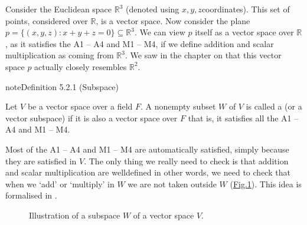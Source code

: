 \documentclass[letterpaper,10pt,english]{jupyterBook}
\let\sphinxpxdimen\pdfpxdimen\else\newdimen\sphinxpxdimen
\begin{document}
\sphinxAtStartPar
Consider the Euclidean space \(\mathbb{R}^3\) (denoted using \(x,y,z\)\sphinxhyphen{}coordinates). This set of points, considered over \(\mathbb{R}\), is a vector space. Now consider the plane \(p = \{(x,y,z) : x + y + z = 0\} \subseteq \mathbb{R}^3\). We can view \(p\) itself as a vector space over \(\mathbb{R}\), as it satisfies the {\hyperref[\detokenize{_pages/5.1_Vector_spaces_definitions:vector-space-axioms}]{}} A1 – A4 and M1 – M4, if we define addition and scalar multiplication as coming from \(\mathbb{R}^3\). We saw in the chapter on {\hyperref[\detokenize{_pages/4.0_Coordinate_geometry:co-ordinate-geometry-chapter}]{}} that this vector space \(p\) actually closely resembles \(\mathbb{R}^2\).
\label{_pages/5.2_Subspaces:subspace-definition}
\begin{sphinxadmonition}{note}{Definition 5.2.1 (Subspace)}



\sphinxAtStartPar
Let \(V\) be a vector space over a field \(F\). A non\sphinxhyphen{}empty subset \(W\) of \(V\) is called a  (or a vector subspace) if it is also a vector space over \(F\) \sphinxhyphen{} that is, it satisfies all the {\hyperref[\detokenize{_pages/5.1_Vector_spaces_definitions:vector-space-axioms}]{}} A1 – A4 and M1 – M4.
\end{sphinxadmonition}

\sphinxAtStartPar
Most of the {\hyperref[\detokenize{_pages/5.1_Vector_spaces_definitions:vector-space-axioms}]{}} A1 – A4 and M1 – M4 are automatically satisfied, simply because they are satisfied in \(V\). The only thing we really need to check is that addition and scalar multiplication are well\sphinxhyphen{}defined \sphinxhyphen{} in other words, we need to check that when we ‘add’ or ‘multiply’ in \(W\) we are not taken outside \(W\) (\hyperref[\detokenize{_pages/5.2_Subspaces:subspaces-figure}]{Fig.\@ \ref{\detokenize{_pages/5.2_Subspaces:subspaces-figure}}}). This idea is formalised in {\hyperref[\detokenize{_pages/5.2_Subspaces:subspace-condition-theorem}]{}}.

\begin{figure}[htbp]
\centering
\capstart

\noindent\sphinxincludegraphics[width=350\sphinxpxdimen]{{5_subspaces}.svg}
\caption{Illustration of a subspace \(W\) of a vector space \(V\).}\label{\detokenize{_pages/5.2_Subspaces:subspaces-figure}}\end{figure}
\end{document}
